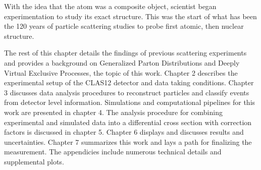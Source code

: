 With the idea that the atom was a composite object, scientist began experimentation to study its exact structure. This was the start of what has been the 120 years of particle scattering studies to probe first atomic, then nuclear structure. 

The rest of this chapter details the findings of previous scattering experiments and provides a background on Generalized Parton Distributions and Deeply Virtual Exclusive Processes, the topic of this work. Chapter 2 describes the experimental setup of the CLAS12 detector and data taking conditions. Chapter 3 discusses data analysis procedures to reconstruct particles and classify events from detector level information. Simulations and computational pipelines for this work are presented in chapter 4. The analysis procedure for combining experimental and simulated data into a differential cross section with correction factors is discussed in chapter 5. Chapter 6 displays and discusses results and uncertainties. Chapter 7 summarizes this work and lays a path for finalizing the measurement. The appendicies include numerous technical details and supplemental plots. 





         
 

